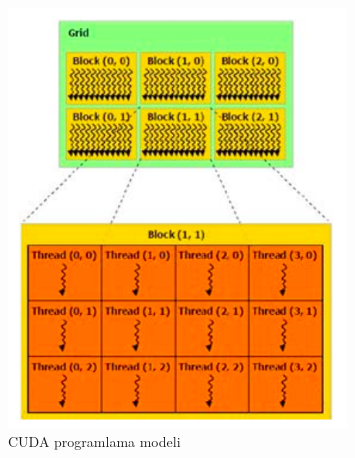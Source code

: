 \begin{figure}[h]
\centering
\shorthandoff{=}
\includegraphics[width=0.8\textwidth]{gorsel/cudaProgrammingStructure.png}
\shorthandoff{=}
\caption{CUDA programlama modeli}
\label{cudaProgrammingStructure}
\end{figure}

